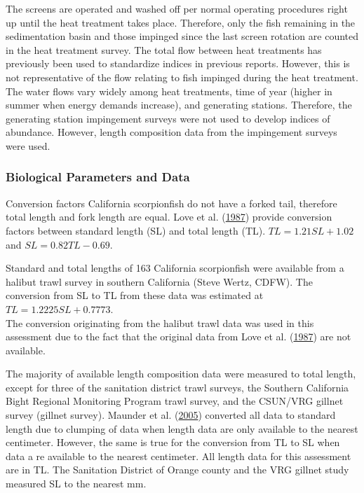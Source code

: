 \documentclass[12pt,]{article}
\begin{document}
The screens are operated and washed off per normal operating procedures
right up until the heat treatment takes place. Therefore, only the fish
remaining in the sedimentation basin and those impinged since the last
screen rotation are counted in the heat treatment survey. The total flow
between heat treatments has previously been used to standardize indices
in previous reports. However, this is not representative of the flow
relating to fish impinged during the heat treatment. The water flows
vary widely among heat treatments, time of year (higher in summer when
energy demands increase), and generating stations. Therefore, the
generating station impingement surveys were not used to develop indices
of abundance. However, length composition data from the impingement
surveys were used.

\subsubsection{Biological Parameters and
Data}\label{biological-parameters-and-data}

Conversion factors California scorpionfish do not have a forked tail,
therefore total length and fork length are equal. Love et al.
(\protect\hyperlink{ref-Love1987}{1987}) provide conversion factors
between standard length (SL) and total length (TL).
\(TL = 1.21SL + 1.02\) and \(SL = 0.82TL - 0.69\).

Standard and total lengths of 163 California scorpionfish were available
from a halibut trawl survey in southern California (Steve Wertz, CDFW).
The conversion from SL to TL from these data was estimated at
\(TL = 1.2225SL + 0.7773\).\\
The conversion originating from the halibut trawl data was used in this
assessment due to the fact that the original data from Love et al.
(\protect\hyperlink{ref-Love1987}{1987}) are not available.

The majority of available length composition data were measured to total
length, except for three of the sanitation district trawl surveys, the
Southern California Bight Regional Monitoring Program trawl survey, and
the CSUN/VRG gillnet survey (gillnet survey). Maunder et al.
(\protect\hyperlink{ref-Maunder2005}{2005}) converted all data to
standard length due to clumping of data when length data are only
available to the nearest centimeter. However, the same is true for the
conversion from TL to SL when data a re available to the nearest
centimeter. All length data for this assessment are in TL. The
Sanitation District of Orange county and the VRG gillnet study measured
SL to the nearest mm.
\end{document}
